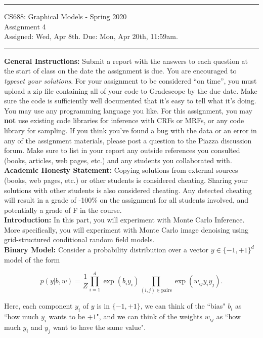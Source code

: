 \documentclass[11pt]{article}
\begin{document}
{\centering
  \rule{6.3in}{2pt}
  \vspace{1em}
  {\Large
    CS688: Graphical Models - Spring 2020\\
    Assignment 4\\
  }
  \vspace{1em}
  Assigned: Wed, Apr 8th. Due: Mon, Apr 20th, 11:59am. \\
  \vspace{0.1em}
  \rule{6.3in}{1.5pt}
}\vspace{1em}

\textbf{General Instructions:} Submit a report with the answers to each question at the start of class on the date the assignment is due. You are encouraged to \emph{typeset your solutions}. For your assignment to be considered ``on time'', you must upload a zip file containing all of your code to Gradescope by the due date. Make sure the code is sufficiently well documented that it's easy to tell what it's doing. You may use any programming language you like. For this assignment, you may \textbf{not} use existing code libraries for inference with CRFs or MRFs, or any code library for sampling. If you think you've found a bug with the data or an error in any of the assignment materials, please post a question to the Piazza discussion forum. Make sure to list in your report any outside references you consulted (books, articles, web pages, etc.) and any students you collaborated with.\\

\textbf{Academic Honesty Statement:} Copying solutions from external sources (books, web pages, etc.) or other students is considered cheating. Sharing your solutions with other students is also considered cheating. Any detected cheating will result in a grade of -100\% on the assignment for all students involved, and potentially a grade of F in the course.\\

\textbf{Introduction:} In this part, you will experiment with Monte Carlo Inference. 
More specifically, you will experiment with Monte Carlo image denoising using grid-structured conditional random field models.\\

\textbf{Binary Model:} Consider a probability distribution over a vector $y \in \{-1,+1\}^d$ model of the form

\[ p(y \vert b,w) = \frac{1}{Z} \prod_{i=1}^d \exp( b_i y_i ) \prod_{(i,j)\in \text{pairs}} \exp(w_{ij} y_i y_j). \]

Here, each component $y_i$ of $y$ is in $\{-1,+1\}$, we can think of the ``bias" $b_i$ as ``how much $y_i$ wants to be $+1$", and we can think of the weights $w_{ij}$ as ``how much $y_i$ and $y_j$ want to have the same value".
\end{document}
